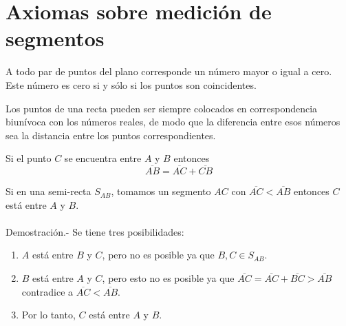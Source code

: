 \chapter{Axiomas sobre medición de segmentos}

\begin{tcolorbox}[colframe=white]
\begin{axioma}
    A todo par de puntos del plano corresponde un número mayor o igual a cero. Este número es cero si y sólo si los puntos son coincidentes.
\end{axioma}
\end{tcolorbox}

\begin{tcolorbox}[colframe=white]
\begin{axioma}
    Los puntos de una recta pueden ser siempre colocados en correspondencia biunívoca con los números reales, de modo que la diferencia entre esos números sea la distancia entre los puntos correspondientes.
\end{axioma}
\end{tcolorbox}

\begin{tcolorbox}[colframe=white]
\begin{axioma}
   Si el punto $C$ se encuentra entre $A$ y $B$ entonces $$\overline{AB}=\overline{AC} + \overline{CB}$$ 
\end{axioma}
\end{tcolorbox}

    \begin{proposicion}
	Si en una semi-recta $S_{AB}$, tomamos un segmento $AC$ con $\overline{AC}<\overline{AB}$ entonces $C$ está entre $A$ y $B$.\\\\
	    Demostración.-\; Se tiene tres posibilidades:
	    \begin{enumerate}[1.]
		\item $A$ está entre $B$ y $C$, pero no es posible ya que $B,C \in S_{AB}$. 
		\item $B$ está entre $A$ y $C$, pero esto no es posible ya que $\overline{AC}=\overline{AC} + \overline{BC}>\overline{AB}$ contradice a $\overline{AC}<\overline{AB}$.
		\item Por lo tanto, $C$ está entre $A$ y $B$. \\\\
	    \end{enumerate}
    \end{proposicion}

